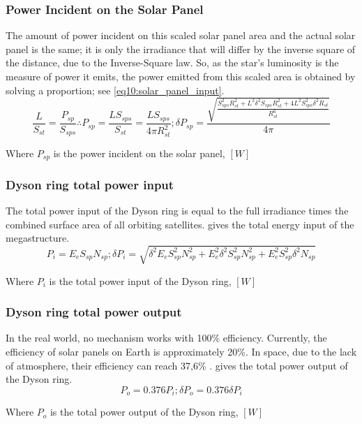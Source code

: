 \documentclass[stu, 11pt, a4paper, floatsintext, noextraspace]{apa7}
\begin{document}
	\subsubsection{Power Incident on the Solar Panel}
	The amount of power incident on this scaled solar panel area and the actual solar panel is the same; it is only the irradiance that will differ by the inverse square of the distance, due to the Inverse-Square law. So, as the star's luminosity is the measure of power it emits, the power emitted from this scaled area is obtained by solving a proportion; see \cref{eq10:solar_panel_input}.
	\begin{equation}
		\label{eq10:solar_panel_input}
		\frac{L}{S_{st}} = \frac{P_{sp}}{S_{sps}} \therefore P_{sp} = \frac{LS_{sps}}{S_{st}}=\frac{LS_{sps}}{4\pi R_{st}^2}; \delta P_{sp}=\frac{\sqrt{\frac{S_{sps}^2R_{st}^2 + L^2\delta^2S_{sps}R_{st}^2+4L^2S_{sps}^2\delta^2R_{st}}{R_{st}^6}}}{4\pi}
	\end{equation}
	\begin{center}
		Where $P_{sp}$ is the power incident on the solar panel, $[W]$
	\end{center}
	\subsubsection{Dyson ring total power input}
	The total power input of the Dyson ring is equal to the full irradiance times the combined surface area of all orbiting satellites.  gives the total energy input of the megastructure.
	\begin{equation}
		\label{eq11:dyson_ring_input}
		P_i=E_eS_{sp}N_{sp}; \delta P_i=\sqrt{\delta^2E_eS_{sp}^2N_{sp}^2+E_e^2\delta^2S_{sp}^2N_{sp}^2+E_e^2S_{sp}^2\delta^2N_{sp}}
	\end{equation}
	\begin{center}
		Where $P_{i}$ is the total power input of the Dyson ring, $[W]$
	\end{center}
	\subsubsection{Dyson ring total power output}
	In the real world, no mechanism works with 100\% efficiency. Currently, the efficiency of solar panels on Earth is approximately 20\%. In space, due to the lack of atmosphere, their efficiency can reach 37,6\% \Parencite{kotamraju_modeling_2019}.  gives the total power output of the Dyson ring.
	\begin{equation}
		\label{eq12:dyson_ring_output}
		P_o=0.376P_i; \delta P_o=0.376\delta P_i
	\end{equation}
	\begin{center}
		Where $P_{o}$ is the total power output of the Dyson ring, $[W]$
	\end{center}
\end{document}
